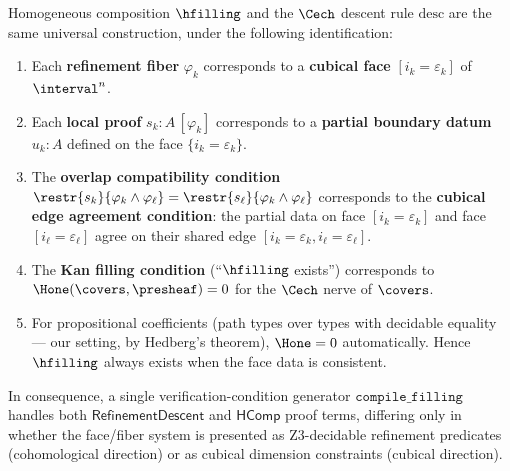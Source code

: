 \begin{theorem}
\label{thm:hcomp-is-descent}
Homogeneous composition $\hfilling$ and the $\Cech$ descent rule
$\mathrm{desc}$ are the same universal construction, under the following
identification:
\begin{enumerate}
\item Each \textbf{refinement fiber} $\varphi_k$ corresponds to a
  \textbf{cubical face} $[i_k = \varepsilon_k]$ of $\interval^n$.

\item Each \textbf{local proof} $s_k : A\,[\varphi_k]$ corresponds to a
  \textbf{partial boundary datum} $u_k : A$ defined on the face
  $\{i_k = \varepsilon_k\}$.

\item The \textbf{overlap compatibility condition}
  $\restr{s_k}{\varphi_k \wedge \varphi_\ell}
  = \restr{s_\ell}{\varphi_k \wedge \varphi_\ell}$
  corresponds to the \textbf{cubical edge agreement condition}:
  the partial data on face $[i_k = \varepsilon_k]$ and face
  $[i_\ell = \varepsilon_\ell]$ agree on their shared edge
  $[i_k = \varepsilon_k, i_\ell = \varepsilon_\ell]$.

\item The \textbf{Kan filling condition} (``$\hfilling$ exists'')
  corresponds to $\Hone(\covers, \presheaf) = 0$ for the $\Cech$ nerve
  of $\covers$.

\item For propositional coefficients (path types over types with
  decidable equality --- our setting, by Hedberg's theorem),
  $\Hone = 0$ automatically.  Hence $\hfilling$ always exists
  when the face data is consistent.
\end{enumerate}
In consequence, a single verification-condition generator
$\mathtt{compile\_filling}$ handles both $\mathsf{RefinementDescent}$
and $\mathsf{HComp}$ proof terms, differing only in whether the
face/fiber system is presented as Z3-decidable refinement predicates
(cohomological direction) or as cubical dimension constraints
(cubical direction).
\end{theorem}

